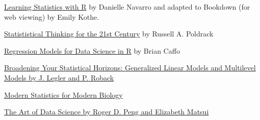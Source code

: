 \documentclass[]{book}
\begin{document}
\href{https://https://learningstatisticswithr-bookdown.netlify.com}{Learning
Statistics with R} by Danielle Navarro and adapted to Bookdown (for web
viewing) by Emily Kothe.

\href{http://statsthinking21.org}{Statististical Thinking for the 21st
Century} by Russell A. Poldrack

\href{https://leanpub.com/regmods}{Regression Models for Data Science in
R} by Brian Caffo

\href{https://bookdown.org/roback/bookdown-bysh/}{Broadening Your
Statistical Horizons: Generalized Linear Models and Multilevel Models by
J. Legler and P. Roback}

\href{https://www.huber.embl.de/msmb/index.html}{Modern Statistics for
Modern Biology}

\href{https://bookdown.org/rdpeng/artofdatascience/}{The Art of Data
Science by Roger D. Peng and Elizabeth Matsui}


\end{document}

